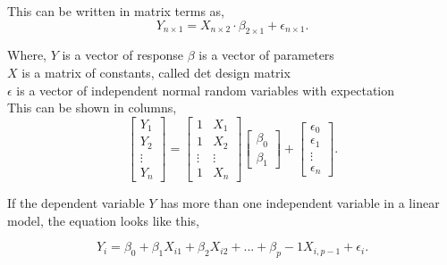 \noindent This can be written in matrix terms as, 
$$Y_{n \times 1}=X_{n \times 2} \cdot \beta_{2 \times 1} + \epsilon_{n \times 1} .$$	

\noindent Where, \newline
\textbf{$Y$} is a vector of response \newline
\textbf{$\beta$} is a vector of parameters \\
\textbf{$X$} is a matrix of constants, called det design matrix\\
\textbf{$\epsilon$} is a vector of independent normal random variables with expectation\\

\noindent This can be shown in columns,
$$
\left[
\begin{array}{c}
	Y_1 \\ 
	Y_2 \\ 
	\vdots \\
	Y_n 
\end{array}
\right]
=
\left[
\begin{array}{cc}
	1 & X_1 \\ 
	1 & X_2 \\ 
	\vdots & \vdots \\
	1 & X_n
\end{array}
\right]
\left[
\begin{array}{c}
	\beta_0 \\ 
	\beta_1 
\end{array}
\right]
+
\left[
\begin{array}{c}
	\epsilon_0 \\ 
	\epsilon_1 \\
	\vdots \\
	\epsilon_n 
\end{array}
\right].
$$

\noindent If the dependent variable $Y$ has more than one independent variable in a linear model, the equation looks like this, 

$$Y_i = \beta_0 + \beta_1 X_{i1} + \beta_2 X_{i2} + ... + \beta_p-1 X_{i, p-1} + \epsilon_i .$$


